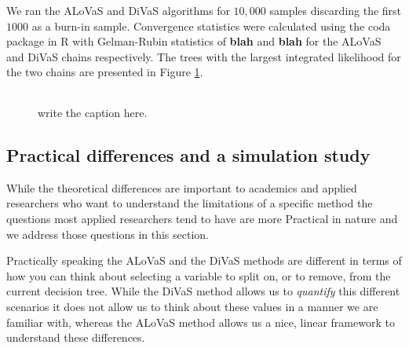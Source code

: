 We ran the ALoVaS and DiVaS algorithms for $10,000$ samples discarding the first $1000$ as a burn-in sample. Convergence statistics were calculated using the coda package in R with Gelman-Rubin statistics of \textbf{blah} and \textbf{blah} for the ALoVaS and DiVaS chains respectively. The trees with the largest integrated likelihood for the two chains are presented in Figure \ref{fig:chain_max_interaction_tree}.  

\begin{figure}
\begin{center} 
\begin{tabular}{cc}
\end{tabular}
\caption{write the caption here.}
\label{fig:chain_max_interaction_tree}
\end{center}
\end{figure} 

\subsection{Practical differences and a simulation study}

While the theoretical differences are important to academics and applied researchers who want to understand the limitations of a specific method the questions most applied researchers tend to have are more Practical in nature and we address those questions in this section. 

Practically speaking the ALoVaS and the DiVaS methods are different in terms of how you can think about selecting a variable to split on, or to remove, from the current decision tree. While the DiVaS method allows us to \emph{quantify} this different scenarios it does not allow us to think about these values in a manner we are familiar with, whereas the ALoVaS method allows us a nice, linear framework to understand these differences. 

